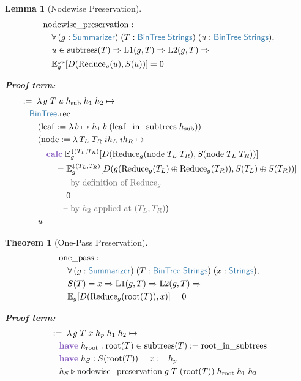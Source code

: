 \documentclass[11pt]{article}
\theoremstyle{definition}
\theoremstyle{plain}
\newtheorem{lemenv}{Lemma}
\newtheorem{thmenv}{Theorem}
\newcommand{\kw}[1]{\textcolor{keyword}{\textbf{#1}}}
\newcommand{\ty}[1]{\textcolor{type}{\mathsf{#1}}}
\newcommand{\fn}[1]{\mathrm{#1}}
\newcommand{\cmt}[1]{\textcolor{comment}{\text{-- #1}}}
\newcommand{\lam}{\lambda\,}
\newcommand{\all}{\forall\,}
\newcommand{\Arr}{\Rightarrow}
\newcommand{\pf}{:=\;}
\newcommand{\Strings}{\ty{Strings}}
\newcommand{\concat}{\oplus}
\newcommand{\Eg}{\mathbb{E}_g}
\newcommand{\Egu}[1]{\mathbb{E}_g^{\downarrow #1}}
\newcommand{\reduce}{\fn{Reduce}_g}
\begin{document}
\begin{lemenv}[Nodewise Preservation]
\label{lem:nodewise}
\begin{align*}
&\fn{nodewise\_preservation} : \\
&\quad \all (g : \ty{Summarizer})\; (T : \ty{BinTree}\;\Strings)\; (u : \ty{BinTree}\;\Strings), \\
&\quad u \in \fn{subtrees}(T) \Arr \fn{L1}(g, T) \Arr \fn{L2}(g, T) \Arr \\
&\quad \Egu{u}[D(\reduce(u), S(u))] = 0
\end{align*}

\textbf{Proof term:}
\begin{align*}
&\pf \lam g\; T\; u\; h_{\text{sub}}\; h_1\; h_2 \mapsto \\
&\quad \ty{BinTree}.\fn{rec} \\
&\quad\quad (\fn{leaf} := \lam b \mapsto h_1\; b\; (\fn{leaf\_in\_subtrees}\; h_{\text{sub}})) \\
&\quad\quad (\fn{node} := \lam T_L\; T_R\; ih_L\; ih_R \mapsto \\
&\quad\quad\quad \kw{calc}\; \Egu{(T_L,T_R)}[D(\reduce(\fn{node}\; T_L\; T_R), S(\fn{node}\; T_L\; T_R))] \\
&\quad\quad\quad\quad = \Egu{(T_L,T_R)}[D(g(\reduce(T_L) \concat \reduce(T_R)), S(T_L) \concat S(T_R))] \\
&\quad\quad\quad\quad\quad \cmt{by definition of $\reduce$} \\
&\quad\quad\quad\quad = 0 \\
&\quad\quad\quad\quad\quad \cmt{by $h_2$ applied at $(T_L, T_R)$}) \\
&\quad\quad u
\end{align*}
\end{lemenv}

\begin{thmenv}[One-Pass Preservation]
\label{thm:onepass}
\begin{align*}
&\fn{one\_pass} : \\
&\quad \all (g : \ty{Summarizer})\; (T : \ty{BinTree}\;\Strings)\; (x : \Strings), \\
&\quad S(T) = x \Arr \fn{L1}(g, T) \Arr \fn{L2}(g, T) \Arr \\
&\quad \Eg[D(\reduce(\fn{root}(T)), x)] = 0
\end{align*}

\textbf{Proof term:}
\begin{align*}
&\pf \lam g\; T\; x\; h_p\; h_1\; h_2 \mapsto \\
&\quad \kw{have}\; h_{\text{root}} : \fn{root}(T) \in \fn{subtrees}(T) := \fn{root\_in\_subtrees} \\
&\quad \kw{have}\; h_S : S(\fn{root}(T)) = x := h_p \\
&\quad h_S \triangleright \fn{nodewise\_preservation}\; g\; T\; (\fn{root}(T))\; h_{\text{root}}\; h_1\; h_2
\end{align*}
\end{thmenv}
\end{document}
